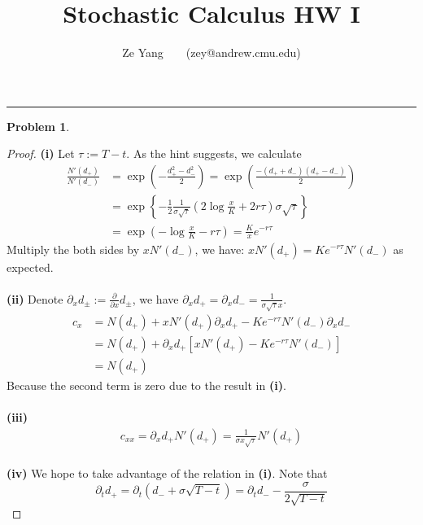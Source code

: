 \documentclass[a4paper, 10pt]{article}
\title{\textbf{Stochastic Calculus HW I}}
\author{Ze Yang~~~~(zey@andrew.cmu.edu)}
\theoremstyle{definition}
\newtheorem{problem}{Problem}
\theoremstyle{hSol}
\begin{document}
\maketitle



\noindent\rule{16cm}{0.4pt}
\begin{problem} 
\end{problem}
\begin{proof} \textbf{(i)} Let $\tau:=T-t$. As the hint suggests, we calculate
\begin{equation}
	\begin{split}
		\frac{N'(d_+)}{N'(d_-)} &= \exp\left(	-\frac{d_+^2 - d_-^2}{2}\right) = \exp\left(\frac{-(d_++d_-)(d_+-d_-)}{2}\right) \\
		&=\exp\left\{-\frac{1}{2}\frac{1}{\sigma\sqrt{\tau}}\left(2\log \frac{x}{K}+2r\tau\right)\sigma\sqrt{\tau}\right\} \\
		&= \exp\left(-\log\frac{x}{K}-r\tau\right) = \frac{K}{x}e^{-r\tau}
	\end{split}
\end{equation}
Multiply the both sides by $xN'(d_-)$, we have: $xN'(d_+) = Ke^{-r\tau}N'(d_-)$ as expected. \\
~\\
\textbf{(ii)} Denote $\partial_x d_{\pm}:=\frac{\partial }{\partial x} d_{\pm}$, we have $\partial_x d_+ = \partial_x d_- = \frac{1}{\sigma\sqrt{\tau}x}$.
\begin{equation}
	\begin{split}
		c_x &= N(d_+) + xN'(d_+)\partial_x d_+ - Ke^{-r\tau} N'(d_-) \partial_x d_- \\
		&= N(d_+) + \partial_x d_+\left[xN'(d_+)-Ke^{-r\tau} N'(d_-)\right]\\
		&= N(d_+)
	\end{split}
\end{equation}
Because the second term is zero due to the result in \textbf{(i)}.\\
~\\
\textbf{(iii)}
\begin{equation}
	\begin{split}
		c_{xx} = \partial_x d_+ N'(d_+) = \frac{1}{\sigma x \sqrt{\tau}}N'(d_+)
	\end{split}
\end{equation}
~\\
\textbf{(iv)} We hope to take advantage of the relation in \textbf{(i)}. Note that
$$
\partial_t d_+ = \partial_t (d_-+\sigma\sqrt{T-t}) = \partial_t d_- - \frac{\sigma}{2\sqrt{T-t}}
$$
\end{proof}
\end{document}
